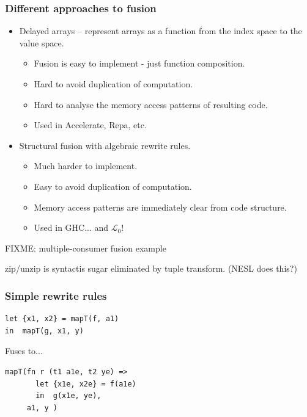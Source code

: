 \documentclass{beamer}
\newcommand{\LO}{$\mathcal{L}_0$}
\begin{document}
\begin{frame}
  \frametitle{Different approaches to fusion}

  \begin{itemize}
  \item Delayed arrays -- represent arrays as a function from the index
    space to the value space.
    \begin{itemize}
    \item Fusion is easy to implement - just function composition.
    \item Hard to avoid duplication of computation.
    \item Hard to analyse the memory access patterns of resulting code.
    \item Used in Accelerate, Repa, etc.
    \end{itemize}
  \item Structural fusion with algebraic rewrite rules.
    \begin{itemize}
    \item Much harder to implement.
    \item Easy to avoid duplication of computation.
    \item Memory access patterns are immediately clear from code
      structure.
    \item Used in GHC... and \LO{}!
    \end{itemize}
  \end{itemize}

  FIXME: multiple-consumer fusion example
\end{frame}

\begin{frame}
  zip/unzip is syntactis sugar eliminated by tuple transform. (NESL does this?)
\end{frame}

\begin{frame}[fragile]
  \frametitle{Simple rewrite rules}

  \begin{lstlisting}
let {x1, x2} = mapT(f, a1)
in  mapT(g, x1, y)
\end{lstlisting}
Fuses to...
\begin{lstlisting}
mapT(fn r (t1 a1e, t2 ye) =>
       let {x1e, x2e} = f(a1e)
       in  g(x1e, ye),
     a1, y )
\end{lstlisting}

\end{frame}
\end{document}

